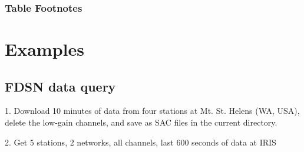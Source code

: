 \documentclass[letterpaper,11pt,english]{sphinxmanual}
\begin{document}
\subsubsection*{Table Footnotes}


\section{Examples}
\label{\detokenize{src/Appendices/examples:examples}}\label{\detokenize{src/Appendices/examples:webex}}\label{\detokenize{src/Appendices/examples::doc}}

\subsection{FDSN data query}
\label{\detokenize{src/Appendices/examples:fdsn-data-query}}
1. Download 10 minutes of data from four stations at Mt. St. Helens (WA, USA), delete the low-gain channels, and save as SAC files in the current directory.

\begin{sphinxVerbatim}[commandchars=\\\{\}]
     
  
  
\end{sphinxVerbatim}

2. Get 5 stations, 2 networks, all channels, last 600 seconds of data at IRIS

\begin{sphinxVerbatim}[commandchars=\\\{\}]
  
  
  
      
\end{sphinxVerbatim}
\end{document}
